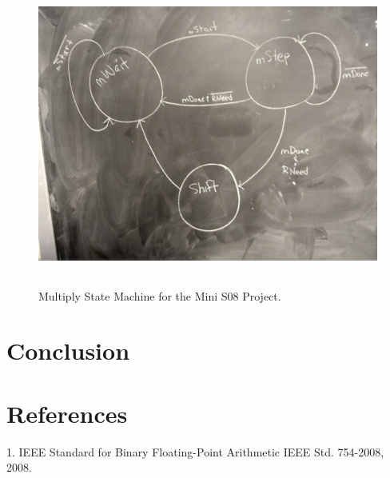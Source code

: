 \documentclass[letterpaper, 12pt]{article}
\begin{document}
\begin{flushleft}
 \begin{figure}[H]
	\includegraphics[width=\linewidth,height=10cm,keepaspectratio]{multiply_states.jpg}
	\caption[Mini S08 Multiply State Machine Diagram]{Multiply State Machine for the Mini S08 Project.}
	\label{fig:arch}
\end{figure}
\section*{Conclusion}

\newpage
\section*{References}
1. IEEE Standard for Binary Floating-Point Arithmetic IEEE Std. 754-2008, 2008. 
\end{flushleft}
\end{document}

